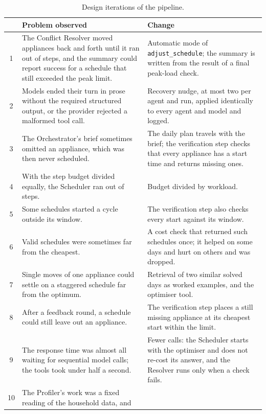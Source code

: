 \documentclass[12pt,a4paper]{report}
\begin{document}
\begin{table}[h!]
\caption{Design iterations of the pipeline.}
\label{tab:iterations}
\small
\begin{tabularx}{\textwidth}{c>{\raggedright\arraybackslash}X>{\raggedright\arraybackslash}X}
\toprule
& Problem observed & Change \\
\midrule
1 & The Conflict Resolver moved appliances back and forth until it ran
  out of steps, and the summary could report success for a schedule that
  still exceeded the peak limit. &
  Automatic mode of \texttt{adjust\_schedule}; the summary is written
  from the result of a final peak-load check. \\[3pt]
2 & Models ended their turn in prose without the required structured
  output, or the provider rejected a malformed tool call. &
  Recovery nudge, at most two per agent and run, applied identically to
  every agent and model and logged. \\[3pt]
3 & The Orchestrator's brief sometimes omitted an appliance, which was
  then never scheduled. &
  The daily plan travels with the brief; the verification step checks
  that every appliance has a start time and returns missing ones. \\[3pt]
4 & With the step budget divided equally, the Scheduler ran out of
  steps. & Budget divided by workload. \\[3pt]
5 & Some schedules started a cycle outside its window. &
  The verification step also checks every start against its window. \\[3pt]
6 & Valid schedules were sometimes far from the cheapest. &
  A cost check that returned such schedules once; it helped on some days
  and hurt on others and was dropped. \\[3pt]
7 & Single moves of one appliance could settle on a staggered schedule
  far from the optimum. &
  Retrieval of two similar solved days as worked examples, and the
  optimiser tool. \\[3pt]
8 & After a feedback round, a schedule could still leave out an
  appliance. &
  The verification step places a still missing appliance at its
  cheapest start within the limit. \\[3pt]
9 & The response time was almost all waiting for sequential model
  calls; the tools took under half a second. &
  Fewer calls: the Scheduler starts with the optimiser and does not
  re-cost its answer, and the Resolver runs only when a check fails. \\[3pt]
10 & The Profiler's work was a fixed reading of the household data, and

\end{tabularx}
\end{table}
\end{document}
